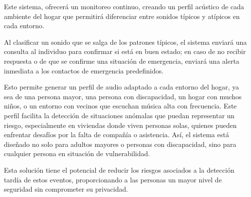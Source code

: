 Este sistema, ofrecerá un monitoreo continuo, creando un perfil acústico de cada ambiente del hogar que permitirá diferenciar entre sonidos típicos y atípicos en cada entorno.

Al clasificar un sonido que se salga de los patrones típicos, el sistema enviará una consulta al individuo para confirmar si está en buen estado; en caso de no recibir respuesta o de que se confirme una situación de emergencia, enviará una alerta inmediata a los contactos de emergencia predefinidos.

Esto permite generar un perfil de audio adaptado a cada entorno del hogar, ya sea de una persona mayor, una persona con discapacidad, un hogar con muchos niños, o un entorno con vecinos que escuchan música alta con frecuencia. Este perfil facilita la detección de situaciones anómalas que puedan representar un riesgo, especialmente en viviendas donde viven personas solas, quienes pueden enfrentar desafíos por la falta de compañía o asistencia. Así, el sistema está diseñado no solo para adultos mayores o personas con discapacidad, sino para cualquier persona en situación de vulnerabilidad.

Esta solución tiene el potencial de reducir los riesgos asociados a la detección tardía de estos eventos, proporcionando a las personas un mayor nivel de seguridad sin comprometer su privacidad.

